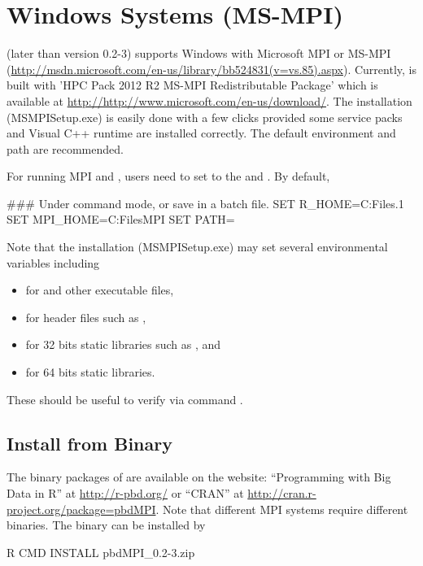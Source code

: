 

\section[Windows Systems (MS-MPI)]{Windows Systems (MS-MPI)}
\label{sec:windows_systems_msmpi}

 (later than version 0.2-3) supports Windows with
Microsoft MPI or MS-MPI
(\url{http://msdn.microsoft.com/en-us/library/bb524831(v=vs.85).aspx}).
Currently,  is built with
'HPC Pack 2012 R2 MS-MPI Redistributable Package' which is available
at \url{http://http://www.microsoft.com/en-us/download/}.
The installation (MSMPISetup.exe) is easily done with a few clicks
provided some service packs and Visual C++ runtime are installed correctly.
The default environment and path are recommended.

For running MPI and , users need to set  to the
 and . By default,
\begin{Command}
### Under command mode, or save in a batch file.
SET R_HOME=C:\Program Files\R{}.1
SET MPI_HOME=C:\Program Files\Microsoft MPI
SET PATH=%
\end{Command}

Note that the installation (MSMPISetup.exe) may set
several environmental variables including
\begin{itemize}
\item {} for  and other executable files,
\item {} for header files such as ,
\item {} for 32 bits static libraries such as ,
      and
\item {} for 64 bits static libraries.
\end{itemize}
These should be useful to verify via  command .


\subsection[Install from Binary]{Install from Binary}
\label{sec:install_from_binary}

The binary packages of  are available on the website:
``Programming with Big Data in R'' at
\url{http://r-pbd.org/} or
``CRAN'' at
\url{http://cran.r-project.org/package=pbdMPI}.
Note that different MPI systems require different binaries.
The binary can be installed by
\begin{Command}
R CMD INSTALL pbdMPI_0.2-3.zip
\end{Command}

